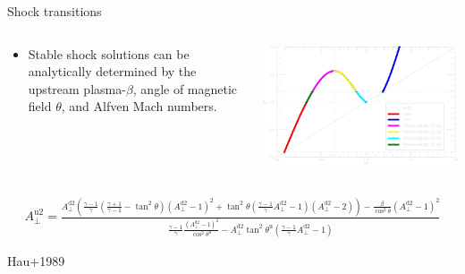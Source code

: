 \documentclass[10pt,aspectratio=169,usenames,dvipsnames]{beamer}
\begin{document}
\begin{frame}{Shock transitions}
\begin{columns}
\begin{column}{0.4\textwidth}
\begin{itemize}
    \item Stable shock solutions can be analytically determined by the upstream plasma-$\beta$, angle of magnetic field $\theta$, and Alfven Mach numbers.
\end{itemize}
\end{column}
\begin{column}{0.6\textwidth}
\includegraphics[width=0.95\linewidth]{2023NAM/Figures/shockjumps_0.125pi.png}
\end{column}
\end{columns}
\begin{gather}
    A_\perp ^{\text{u}2} = \frac{ A_\perp ^{\text{d}2} \left( \frac{\gamma-1}{\gamma} \left( \frac{\gamma+1}{\gamma -1} -\tan ^2 \theta \right) \left(A_\perp ^{\text{d}2} -1 \right) ^2 + \tan ^2 \theta  \left( \frac{\gamma-1}{\gamma} A_\perp ^{\text{d}2} -1 \right) \left(A_\perp ^{\text{d}2} -2 \right) \right) - \frac{\beta }{ \cos ^2 \theta } \left( A_\perp ^{\text{d}2} -1 \right) ^2 } { \frac{\gamma -1}{\gamma} \frac{\left( A_\perp ^{\text{d}2}-1 \right) ^2}{ \cos ^2 \theta ^{\text{u}}} - A_ \perp ^{\text{d}2} \tan ^2 \theta ^{\text{u}} \left( \frac{\gamma -1}{\gamma} A_\perp ^{\text{d}2} -1 \right) } \label{eqn:hau}
\end{gather}
\begin{flushright}
{\small Hau+1989}
\end{flushright}
\end{frame}
\end{document}
